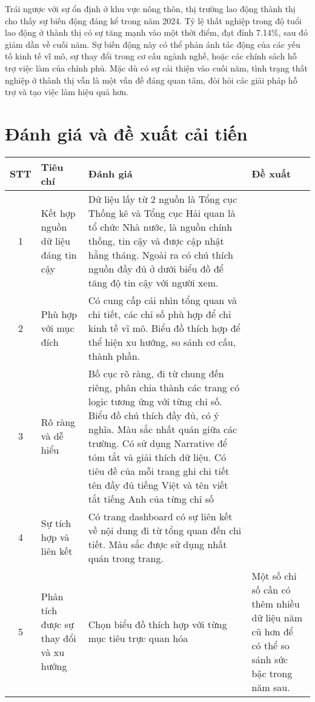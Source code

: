 \documentclass[a4paper]{report}
\begin{document}
{{Trái ngược với sự ổn định ở khu vực nông thôn, thị trường lao động thành thị cho thấy sự biến động đáng kể trong năm 2024. Tỷ lệ thất nghiệp trong độ tuổi lao động ở thành thị có sự tăng mạnh vào một thời điểm, đạt đỉnh 7.14\%, sau đó giảm dần về cuối năm. Sự biến động này có thể phản ánh tác động của các yếu tố kinh tế vĩ mô, sự thay đổi trong cơ cấu ngành nghề, hoặc các chính sách hỗ trợ việc làm của chính phủ. Mặc dù có sự cải thiện vào cuối năm, tình trạng thất nghiệp ở thành thị vẫn là một vấn đề đáng quan tâm, đòi hỏi các giải pháp hỗ trợ và tạo việc làm hiệu quả hơn.


\newpage
\section{Đánh giá và đề xuất cải tiến}
\begin{table}[h]
    \centering
    \begin{tabular}{|c| m{2.5cm} | m{6cm} | m{5.5cm} |}
        \hline
        \textbf{STT} & \textbf{Tiêu chí} & \textbf{Đánh giá} & \textbf{Đề xuất} \\
        \hline
        1 & Kết hợp nguồn dữ liệu đáng tin cậy & Dữ liệu lấy từ 2 nguồn là Tổng cục Thống kê và Tổng cục Hải quan là tổ chức Nhà nước, là nguồn chính thống, tin cậy và được cập nhật hằng tháng. Ngoài ra có chú thích nguồn đầy đủ ở dưới biểu đồ để tăng độ tin cậy với người xem. &   \\
        \hline
        2 & Phù hợp với mục đích & Có cung cấp cái nhìn tổng quan và chi tiết, các chỉ số phù hợp để chỉ kinh tế vĩ mô. Biểu đồ thích hợp để thể hiện xu hướng, so sánh cơ cấu, thành phần. &   \\
        \hline
        3 & Rõ ràng và dễ hiểu & Bố cục rõ ràng, đi từ chung đến riêng, phân chia thành các trang có logic tương ứng với từng chỉ số. Biểu đồ chú thích đầy đủ, có ý nghĩa. Màu sắc nhất quán giữa các trường. Có sử dụng Narrative để tóm tắt và giải thích dữ liệu. Có tiêu đề của mỗi trang ghi chi tiết tên đầy đủ tiếng Việt và tên viết tắt tiếng Anh của từng chỉ số &  \\
        \hline
        4 & Sự tích hợp và liên kết & Có trang dashboard có sự liên kết về nội dung đi từ tổng quan đến chi tiết. Màu sắc được sử dụng nhất quán trong trang. &   \\
        \hline
        5 & Phân tích được sự thay đổi và xu hướng & Chọn biểu đồ thích hợp với từng mục tiêu trực quan hóa & Một số chỉ số cần có thêm nhiều dữ liệu năm cũ hơn để có thể so sánh sức bậc trong năm sau. \\

\end{tabular}
\end{table}}}
\end{document}
